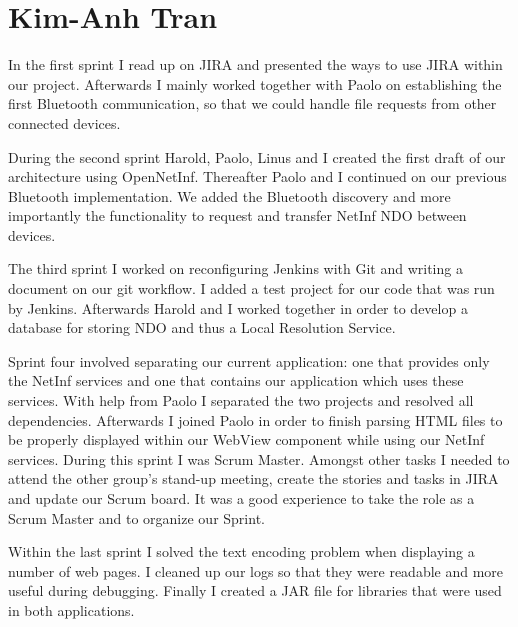 \section{Kim-Anh Tran}
In the first sprint I read up on JIRA and presented the ways to use
JIRA within our project. Afterwards I mainly worked together with Paolo on establishing
the first Bluetooth communication, so that we could handle file requests from other connected
devices. %

During the second sprint Harold, Paolo, Linus and I created the first draft of our architecture using OpenNetInf. Thereafter Paolo and I continued on our previous Bluetooth implementation. We added
the Bluetooth discovery and more importantly the functionality to request and
transfer NetInf NDO between devices.

The third sprint I worked on reconfiguring Jenkins with Git and writing a document on
our git workflow. I added a test project for our code that was run by Jenkins.
Afterwards Harold and I worked together in order to develop a database for storing
NDO and thus a Local Resolution Service.

Sprint four involved separating our current application: one that provides
only the NetInf services and one that contains our application which uses
these services. With help from Paolo I separated the two projects and resolved
all dependencies. Afterwards I joined Paolo in order to finish parsing HTML files
to be properly displayed within our WebView component while using our NetInf services.
During this sprint I was Scrum Master. Amongst other tasks I needed to attend the other group's
stand-up meeting, create the stories and tasks in JIRA and update our Scrum board.
It was a good experience to take the role as a Scrum Master and to organize our Sprint.

Within the last sprint I solved the text encoding problem when displaying 
a number of web pages. I cleaned up our logs so that they were readable and
more useful during debugging. Finally I created a JAR file for
libraries that were used in both applications.

